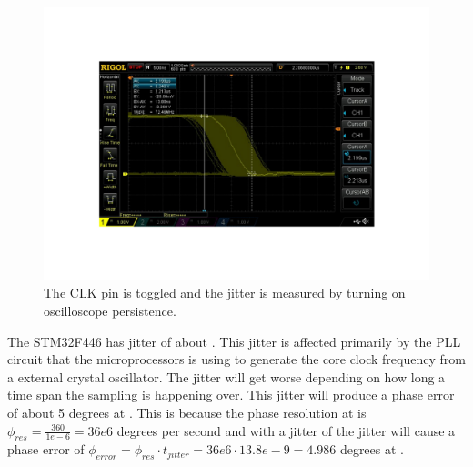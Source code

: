 \begin{figure}[H]
    \centering
    \includegraphics[clip, trim=0 100 0 100, width=1\textwidth]{Appendix/Figures/STM32F446JITTER.pdf}
    \caption{The CLK pin is toggled and the jitter is measured by turning on oscilloscope persistence.}
    \label{fig:App_A_Jitter}
\end{figure}

The STM32F446 has jitter of about . This jitter is affected primarily by the PLL circuit that the microprocessors is using to generate the  core clock frequency from a  external crystal oscillator. The jitter will get worse depending on how long a time span the sampling is happening over. This jitter will produce a phase error of about 5 degrees at . This is because the phase resolution at  is $\phi_{res} = \frac{360}{1e-6} = 36e6$ degrees per second and with a jitter of  the jitter will cause a phase error of $\phi_{error} = \phi_{res} \cdot t_{jitter} = 36e6 \cdot 13.8e-9 = 4.986$ degrees at . 
